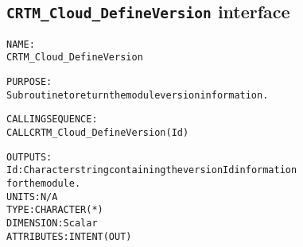\subsection{\texttt{CRTM\_Cloud\_DefineVersion} interface}
  \label{sec:CRTM_Cloud_DefineVersion_interface}
  \begin{alltt}
 
  NAME:
        CRTM_Cloud_DefineVersion
 
  PURPOSE:
        Subroutine to return the module version information.
 
  CALLING SEQUENCE:
        CALL CRTM_Cloud_DefineVersion( Id )
 
  OUTPUTS:
        Id:            Character string containing the version Id information
                       for the module.
                       UNITS:      N/A
                       TYPE:       CHARACTER(*)
                       DIMENSION:  Scalar
                       ATTRIBUTES: INTENT(OUT)
 
  \end{alltt}
